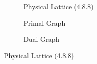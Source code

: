 \documentclass{article}
\begin{document}
\begin{figure}[ht]
    \centering
    \begin{subfigure}{0.31666666666666665\textwidth}
        \centering
        \resizebox{\textwidth}{!}{}
        \caption{Physical Lattice (4.8.8)}
    \end{subfigure}
    \hfill
    \begin{subfigure}{0.31666666666666665\textwidth}
        \centering
        \resizebox{\textwidth}{!}{}
        \caption{Primal Graph}
    \end{subfigure}
    \hfill
    \begin{subfigure}{0.31666666666666665\textwidth}
        \centering
        \resizebox{\textwidth}{!}{}
        \caption{Dual Graph}
    \end{subfigure}
    
    \vspace{0.5cm}
    \caption{Physical Lattice (4.8.8)}
\end{figure}
\end{document}
